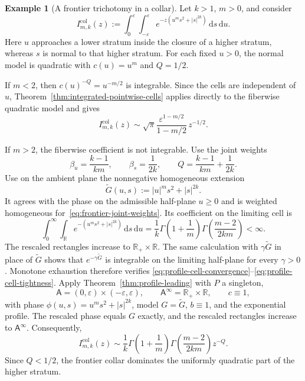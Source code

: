 \documentclass[11pt]{amsart}
\numberwithin{equation}{section}
\theoremstyle{definition}
\newtheorem{example}[theorem]{Example}
\theoremstyle{remark}
\newcommand{\R}{\mathbb{R}}
\newcommand{\dd}{\,\mathrm{d}}
\newcommand{\eps}{\varepsilon}
\newcommand{\Afib}{\mathsf{A}}
\begin{document}
\begin{example}[A frontier trichotomy in a collar]
\label{ex:frontier-trichotomy}
Let $k>1$, $m>0$, and consider
\begin{equation}\label{eq:frontier-model-integral}
 I^{\mathrm{col}}_{m,k}(z):=\int_0^\eps\int_{-\eps}^{\eps}
 e^{-z(u^m s^2+|s|^{2k})}\dd s\dd u.
\end{equation}
Here $u$ approaches a lower stratum inside the closure of a higher stratum,
whereas $s$ is normal to that higher stratum.  For each fixed $u>0$, the
normal model is quadratic with $c(u)=u^m$ and $Q=1/2$.

If $m<2$, then $c(u)^{-Q}=u^{-m/2}$ is integrable.  Since the cells are
independent of $u$, Theorem~\ref{thm:integrated-pointwise-cells} applies
directly to the fiberwise quadratic model and gives
\begin{equation}\label{eq:frontier-subcritical}
 I^{\mathrm{col}}_{m,k}(z)\sim
 \sqrt\pi\frac{\eps^{1-m/2}}{1-m/2}\,z^{-1/2}.
\end{equation}

If $m>2$, the fiberwise coefficient is not integrable.  Use the joint weights
\begin{equation}\label{eq:frontier-joint-weights}
 \beta_u=\frac{k-1}{km},
 \qquad
 \beta_s=\frac1{2k},
 \qquad
 Q=\frac{k-1}{km}+\frac1{2k}.
\end{equation}
Use on the ambient plane the nonnegative homogeneous extension
\[
 \widetilde G(u,s):=|u|^m s^2+|s|^{2k}.
\]
It agrees with the phase on the admissible half-plane $u\ge0$ and is weighted
homogeneous for~\eqref{eq:frontier-joint-weights}.  Its coefficient on the
limiting cell is
\begin{equation}\label{eq:frontier-model-coefficient}
 \int_0^\infty\int_\R e^{-(u^m s^2+|s|^{2k})}\dd s\dd u
 =\frac1k\Gamma\!\left(1+\frac1m\right)
  \Gamma\!\left(\frac{m-2}{2km}\right)<\infty.
\end{equation}
The rescaled rectangles increase to $\R_+\times\R$.  The same calculation
with $\gamma\widetilde G$ in place of $\widetilde G$ shows that
$e^{-\gamma\widetilde G}$ is integrable on the limiting half-plane for every
$\gamma>0$.  Monotone exhaustion therefore verifies
\eqref{eq:profile-cell-convergence}--\eqref{eq:profile-cell-tightness}.
Apply Theorem~\ref{thm:profile-leading} with $P$ a singleton,
\[
 \Afib=(0,\eps)\times(-\eps,\eps),
 \qquad
 \Afib^\infty=\R_+\times\R,
 \qquad
 c\equiv1,
\]
with phase $\phi(u,s)=u^m s^2+|s|^{2k}$, model $G=\widetilde G$,
$b\equiv1$, and the exponential profile.  The rescaled phase equals $G$
exactly, and the rescaled rectangles increase to $\Afib^\infty$.  Consequently,
\begin{equation}\label{eq:frontier-supercritical}
 I^{\mathrm{col}}_{m,k}(z)\sim
 \frac1k\Gamma\!\left(1+\frac1m\right)
 \Gamma\!\left(\frac{m-2}{2km}\right)z^{-Q}.
\end{equation}
Since $Q<1/2$, the frontier collar dominates the uniformly quadratic part of
the higher stratum.


\end{example}
\end{document}
